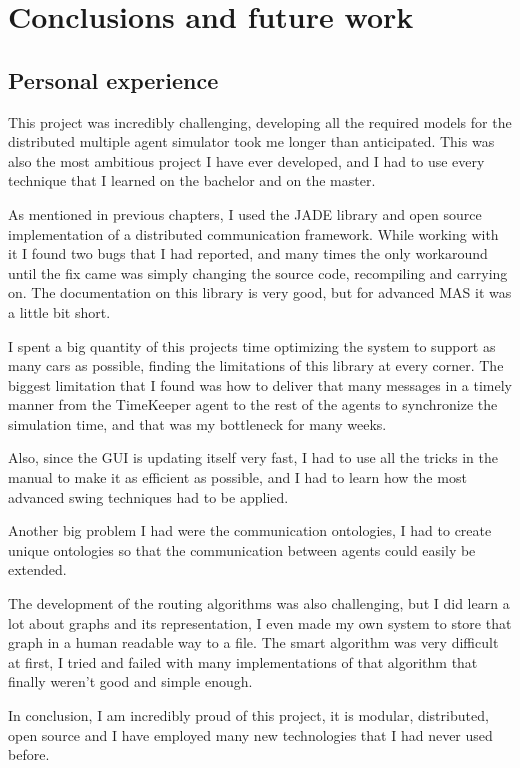 \chapter{Conclusions and future work}
\label{ch:conclusions}

\section{Personal experience}

This project was incredibly challenging, developing all the required models for the distributed multiple agent simulator took me longer than anticipated. This was also the most ambitious project I have ever developed, and I had to use every technique that I learned on the bachelor and on the master.

As mentioned in previous chapters, I used the JADE library and open source implementation of a distributed communication framework. While working with it I found two bugs that I had reported, and many times the only workaround until the fix came was simply changing the source code, recompiling and carrying on. The documentation on this library is very good, but for advanced MAS it was a little bit short.

I spent a big quantity of this projects time optimizing the system to support as many cars as possible, finding the limitations of this library at every corner. The biggest limitation that I found was how to deliver that many messages in a timely manner from the TimeKeeper agent to the rest of the agents to synchronize the simulation time, and that was my bottleneck for many weeks.

Also, since the GUI is updating itself very fast, I had to use all the tricks in the manual to make it as efficient as possible, and I had to learn how the most advanced swing techniques had to be applied.

Another big problem I had were the communication ontologies, I had to create unique ontologies so that the communication between agents could easily be extended.

The development of the routing algorithms was also challenging, but I did learn a lot about graphs and its representation, I even made my own system to store that graph in a human readable way to a file. The smart algorithm was very difficult at first, I tried and failed with many implementations of that algorithm that finally weren't good and simple enough.

In conclusion, I am incredibly proud of this project, it is modular, distributed, open source and I have employed many new technologies that I had never used before.

